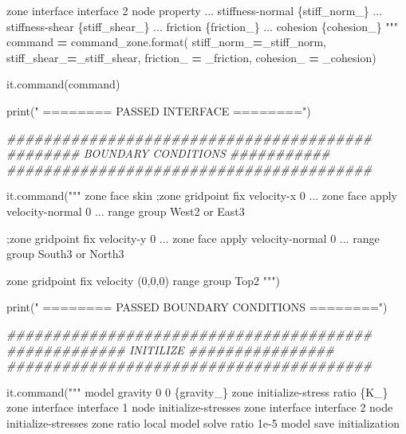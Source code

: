 \documentclass[a4paper, nobind]{templates/ociamthesis}
\newenvironment{Shaded}{\begin{snugshade}}{\end{snugshade}}
\newcommand{\BuiltInTok}[1]{#1}
\newcommand{\CommentTok}[1]{\textcolor[rgb]{0.56,0.35,0.01}{\textit{#1}}}
\newcommand{\NormalTok}[1]{#1}
\newcommand{\OperatorTok}[1]{\textcolor[rgb]{0.81,0.36,0.00}{\textbf{#1}}}
\newcommand{\SpecialCharTok}[1]{\textcolor[rgb]{0.00,0.00,0.00}{#1}}
\newcommand{\StringTok}[1]{\textcolor[rgb]{0.31,0.60,0.02}{#1}}
\renewenvironment{Shaded}
{
  \vspace{10pt}%
  \begin{snugshade}%
}{%
  \end{snugshade}%
  \vspace{8pt}%
}
\begin{document}
\begin{Shaded}
\begin{Highlighting}[]
\StringTok{zone interface \textquotesingle{}interface 2\textquotesingle{} node property ...}
\StringTok{stiffness{-}normal }\SpecialCharTok{\{stiff\_norm\_\}}\StringTok{ ...}
\StringTok{stiffness{-}shear }\SpecialCharTok{\{stiff\_shear\_\}}\StringTok{ ...}
\StringTok{friction }\SpecialCharTok{\{friction\_\}}\StringTok{ ...}
\StringTok{cohesion }\SpecialCharTok{\{cohesion\_\}}
\StringTok{"""}
\NormalTok{command }\OperatorTok{=}\NormalTok{ command\_zone.}\BuiltInTok{format}\NormalTok{(}
\NormalTok{stiff\_norm\_}\OperatorTok{=}\NormalTok{\_stiff\_norm,}
\NormalTok{stiff\_shear\_}\OperatorTok{=}\NormalTok{\_stiff\_shear,}
\NormalTok{friction\_ }\OperatorTok{=}\NormalTok{ \_friction,}
\NormalTok{cohesion\_ }\OperatorTok{=}\NormalTok{ \_cohesion)}

\NormalTok{it.command(command)}

\BuiltInTok{print}\NormalTok{(}\StringTok{"               ======== PASSED INTERFACE ========"}\NormalTok{)}

\CommentTok{\#\#\#\#\#\#\#\#\#\#\#\#\#\#\#\#\#\#\#\#\#\#\#\#\#\#\#\#\#\#\#\#\#\#\#\#\#\#\#\#}
\CommentTok{\#\#\#\#\#\#\#\# BOUNDARY CONDITIONS \#\#\#\#\#\#\#\#\#\#\#}
\CommentTok{\#\#\#\#\#\#\#\#\#\#\#\#\#\#\#\#\#\#\#\#\#\#\#\#\#\#\#\#\#\#\#\#\#\#\#\#\#\#\#\#}


\NormalTok{it.command(}\StringTok{"""}
\StringTok{zone face skin}
\StringTok{;zone gridpoint fix velocity{-}x 0 ...}
\StringTok{zone face apply velocity{-}normal 0 ...}
\StringTok{range group \textquotesingle{}West2\textquotesingle{} or \textquotesingle{}East3\textquotesingle{}}

\StringTok{;zone gridpoint fix velocity{-}y 0 ...}
\StringTok{zone face apply velocity{-}normal 0 ...}
\StringTok{range group \textquotesingle{}South3\textquotesingle{} or \textquotesingle{}North3\textquotesingle{}}

\StringTok{zone gridpoint fix velocity (0,0,0) range group \textquotesingle{}Top2\textquotesingle{}}
\StringTok{"""}\NormalTok{)}

\BuiltInTok{print}\NormalTok{(}\StringTok{"               ======== PASSED BOUNDARY CONDITIONS ========"}\NormalTok{)}

\CommentTok{\#\#\#\#\#\#\#\#\#\#\#\#\#\#\#\#\#\#\#\#\#\#\#\#\#\#\#\#\#\#\#\#\#\#\#\#\#\#\#\#}
\CommentTok{\#\#\#\#\#\#\#\#\#\#\#\#\# INITILIZE \#\#\#\#\#\#\#\#\#\#\#\#\#\#\#\#}
\CommentTok{\#\#\#\#\#\#\#\#\#\#\#\#\#\#\#\#\#\#\#\#\#\#\#\#\#\#\#\#\#\#\#\#\#\#\#\#\#\#\#\#}

\NormalTok{it.command(}\StringTok{"""}
\StringTok{model gravity 0 0 }\SpecialCharTok{\{gravity\_\}}
\StringTok{zone initialize{-}stress ratio }\SpecialCharTok{\{K\_\}}
\StringTok{zone interface \textquotesingle{}interface 1\textquotesingle{} node initialize{-}stresses}
\StringTok{zone interface \textquotesingle{}interface 2\textquotesingle{} node initialize{-}stresses}
\StringTok{zone ratio local}
\StringTok{model solve ratio 1e{-}5}
\StringTok{model save \textquotesingle{}initialization\textquotesingle{}}


\end{Highlighting}
\end{Shaded}
\end{document}
